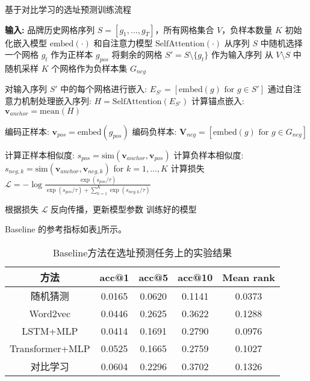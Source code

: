 \documentclass{article}
\begin{document}
\begin{algorithm}[H]
\caption{基于对比学习的选址预测训练流程}
\begin{algorithmic}[1]
\State \textbf{输入:} 品牌历史网格序列 $S = [g_1, ..., g_T]$，所有网格集合 $V$，负样本数量 $K$
\State 初始化嵌入模型 $\text{embed}(\cdot)$ 和自注意力模型 $\text{SelfAttention}(\cdot)$
    \State 从序列 $S$ 中随机选择一个网格 $g_t$ 作为正样本 $g_{pos}$
    \State 将剩余的网格 $S' = S \setminus \{g_t\}$ 作为输入序列
    \State 从 $V \setminus S$ 中随机采样 $K$ 个网格作为负样本集 $G_{neg}$
    
    \State {}
    \State 对输入序列 $S'$ 中的每个网格进行嵌入: $E_{S'} = [\text{embed}(g) \text{ for } g \in S']$
    \State 通过自注意力机制处理嵌入序列: $H = \text{SelfAttention}(E_{S'})$
    \State 计算锚点嵌入: $\mathbf{v}_{anchor} = \text{mean}(H)$
    
    \State {}
    \State 编码正样本: $\mathbf{v}_{pos} = \text{embed}(g_{pos})$
    \State 编码负样本: $\mathbf{V}_{neg} = [\text{embed}(g) \text{ for } g \in G_{neg}]$
    
    \State {}
    \State 计算正样本相似度: $s_{pos} = \text{sim}(\mathbf{v}_{anchor}, \mathbf{v}_{pos})$
    \State 计算负样本相似度: $s_{neg,k} = \text{sim}(\mathbf{v}_{anchor}, \mathbf{v}_{neg,k})$ for $k=1, ..., K$
    \State 计算损失 $\mathcal{L} = -\log \frac{\exp(s_{pos} / \tau)}{\exp(s_{pos} / \tau) + \sum_{k=1}^{K} \exp(s_{neg,k} / \tau)}$
    
    \State {}
    \State 根据损失 $\mathcal{L}$ 反向传播，更新模型参数
\EndFor
\State \Return 训练好的模型
\end{algorithmic}
\end{algorithm}

Baseline 的参考指标如表\ref{tab:baseline_results}所示。

\begin{table}[H]
\centering
\begin{tabular}{|c|c|c|c|c|}
\hline
\rowcolor[HTML]{D9EAD3}
\textbf{方法} & \textbf{acc@1} & \textbf{acc@5} & \textbf{acc@10} & \textbf{Mean rank} \\ \hline
随机猜测 & 0.0165 & 0.0620 & 0.1141 & 0.0373 \\ \hline
Word2vec & 0.0446 & 0.2625 & 0.3622 & 0.1288 \\ \hline
LSTM+MLP & 0.0414 & 0.1691 & 0.2790 & 0.0976 \\ \hline
Transformer+MLP & 0.0525 & 0.1665 & 0.2759 & 0.1027 \\ \hline
对比学习 & 0.0604 & 0.2296 & 0.3702 & 0.1326 \\ \hline
\end{tabular}
\caption{Baseline方法在选址预测任务上的实验结果}
\label{tab:baseline_results}
\end{table}
\end{document}
